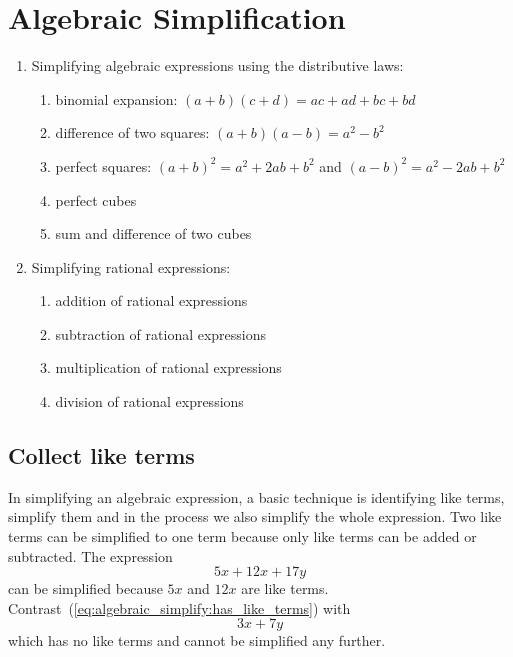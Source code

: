 
\chapter{Algebraic Simplification}

\begin{enumerate}
\item Simplifying algebraic expressions using the distributive laws:
  \begin{enumerate}
  \item binomial expansion: $(a + b)(c + d) = ac + ad + bc + bd$

  \item difference of two squares: $(a + b)(a - b) = a^2 - b^2$

  \item perfect squares: $(a + b)^2 = a^2 + 2ab + b^2$ and
    $(a - b)^2 = a^2 - 2ab + b^2$

  \item perfect cubes

  \item sum and difference of two cubes
  \end{enumerate}

\item Simplifying rational expressions:
  \begin{enumerate}
  \item addition of rational expressions

  \item subtraction of rational expressions

  \item multiplication of rational expressions

  \item division of rational expressions
  \end{enumerate}
\end{enumerate}



\section{Collect like terms}

In simplifying an algebraic expression, a basic technique is
identifying like terms, simplify them and in the process we also
simplify the whole expression. Two like terms can be simplified to one
term because only like terms can be added or subtracted. The
expression
%
\begin{equation}
\label{eq:algebraic_simplify:has_like_terms}
5x + 12x + 17y
\end{equation}
%
can be simplified because $5x$ and $12x$ are like
terms. Contrast~(\ref{eq:algebraic_simplify:has_like_terms}) with
\[
3x + 7y
\]
which has no like terms and cannot be simplified any further.

